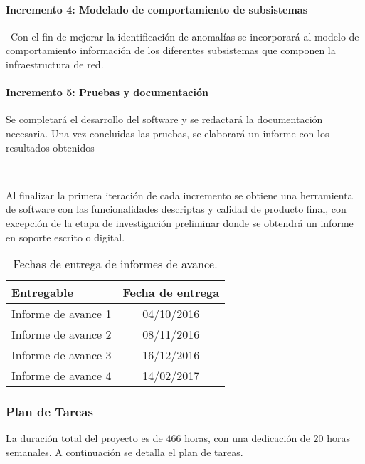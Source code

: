 \paragraph{Incremento 4: Modelado de comportamiento de subsistemas} \
Con el fin de mejorar la identificación de anomalías se incorporará al modelo de comportamiento información de los diferentes subsistemas que componen la infraestructura de red.
\paragraph{Incremento 5: Pruebas y documentación}
Se completará el desarrollo del software y se redactará la documentación necesaria. Una vez concluidas las pruebas, se elaborará un informe con los resultados obtenidos

\ \

Al finalizar la primera iteración de cada incremento se obtiene una herramienta de software con las funcionalidades descriptas y calidad de producto final, con excepción de la etapa de investigación preliminar donde se obtendrá un informe en soporte escrito o digital.



\begin{table}[htbp]
	\begin{center}	
		\begin{tabular}{|l|c|}
			\hline 
			Entregable & Fecha de entrega \\ \hline
			Informe de avance 1 & 04/10/2016 \\
			Informe de avance 2 & 08/11/2016 \\
			Informe de avance 3 & 16/12/2016 \\
			Informe de avance 4 & 14/02/2017 \\ \hline
		\end{tabular}
	\end{center}
	\caption{Fechas de entrega de informes de avance.}
	\label{table:informes}
\end{table}

\subsubsection*{Plan de Tareas}

La duración total del proyecto es de $466$ horas, con una dedicación de $20$ horas semanales. A continuación se detalla el plan de tareas.

